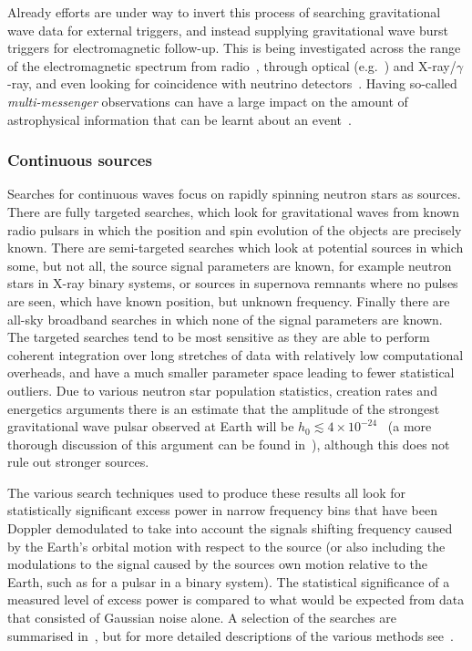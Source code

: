 \documentclass{article}
\begin{document}
Already efforts are under way to invert this process of searching gravitational
wave data for external triggers, and instead supplying gravitational wave burst
triggers for electromagnetic follow-up. This is being investigated across the
range of the electromagnetic spectrum from radio~\cite{Predoi:2010}, through
optical (e.g.~\cite{Kanner:2008, Coward:2010}) and X-ray/$\gamma$-ray, and even
looking for coincidence with neutrino detectors~\cite{Aso:2008, Pradier:2010,
Chassande:2010}. Having so-called \textit{multi-messenger} observations can have a
large impact on the amount of astrophysical information that can be learnt about
an event~\cite{Phinney:2009}.

\subsubsection{Continuous sources}

Searches for continuous waves focus on rapidly spinning neutron stars as
sources. There are fully targeted searches, which look for gravitational waves
from known radio pulsars in which the position and spin evolution of the objects
are precisely known. There are semi-targeted searches which look at potential
sources in which some, but not all, the source signal parameters are known, for
example neutron stars in X-ray binary systems, or sources in supernova remnants
where no pulses are seen, which have known position, but unknown frequency.
Finally there are all-sky broadband searches in which none of the signal
parameters are known. The targeted searches tend to be most sensitive as they
are able to perform coherent integration over long stretches of data with
relatively low computational overheads, and have a much smaller parameter space
leading to fewer statistical outliers. Due to various neutron star population
statistics, creation rates and energetics arguments there is an estimate that
the amplitude of the strongest gravitational wave pulsar observed at Earth will
be $h_0 \lesssim 4\times10^{-24}$~\cite{Abbott:2007a} (a more thorough
discussion of this argument can be found in~\cite{Knispel:2008}), although this
does not rule out stronger sources.

The various search techniques used to produce these results all look for
statistically significant excess power in narrow frequency bins that have been
Doppler demodulated to take into account the signals shifting frequency caused
by the Earth's orbital motion with respect to the source (or also including the
modulations to the signal caused by the sources own motion relative to the
Earth, such as for a pulsar in a binary system). The statistical significance of
a measured level of excess power is compared to what would be expected from data
that consisted of Gaussian noise alone. A selection of the searches are
summarised in~\cite{Prix:2006}, but for more detailed descriptions of the
various methods see~\cite{Brady:2000, Krishnan:2004, Jaranowski:1998,
Abbott:2008e, Abbott:2007a, Dupuis:2005}.
\end{document}
